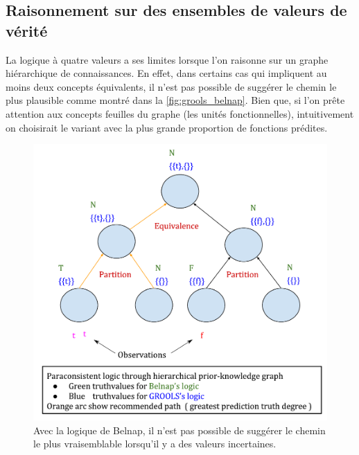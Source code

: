 \begin{refsegment}
\section{Raisonnement sur des ensembles de valeurs de vérité}

La logique à quatre valeurs a ses limites lorsque l'on raisonne sur un graphe hiérarchique de connaissances. En effet, dans certains cas qui impliquent au moins deux concepts équivalents, il n'est pas possible de suggérer le chemin le plus plausible comme montré dans la \cref{fig:grools_belnap}. Bien que, si l'on prête attention aux concepts feuilles du graphe (les unités fonctionnelles), intuitivement on choisirait le variant avec la plus grande proportion de fonctions prédites.

\begin{shadedfigure}[H]
	\begin{subfigure}[t]{.48\textwidth}
		\centering
		\includegraphics[width=\textwidth]{img/GROOLS_vs_belnap_1.pdf}
		\caption{Avec la logique de Belnap, il n'est pas possible de suggérer le chemin le plus vraisemblable lorsqu'il y a des valeurs incertaines.}
		\label{fig:grools_belnap_1}
	\end{subfigure}
	\hfill
	\begin{subfigure}[t]{.48\textwidth}
		\centering

\end{subfigure}
\end{shadedfigure}
\end{refsegment}
